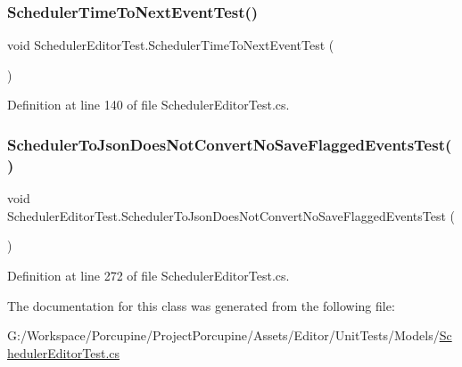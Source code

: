 \mbox{\label{class_scheduler_editor_test_ac42929cff725a4351a4dc54b6fcf05cb}} 
\subsubsection{\texorpdfstring{Scheduler\+Time\+To\+Next\+Event\+Test()}{SchedulerTimeToNextEventTest()}}
{\footnotesize\ttfamily void Scheduler\+Editor\+Test.\+Scheduler\+Time\+To\+Next\+Event\+Test (\begin{DoxyParamCaption}{ }\end{DoxyParamCaption})}



Definition at line 140 of file Scheduler\+Editor\+Test.\+cs.

\mbox{\label{class_scheduler_editor_test_a9307ec4d249726c96f46cfdfaa19c2b7}} 
\subsubsection{\texorpdfstring{Scheduler\+To\+Json\+Does\+Not\+Convert\+No\+Save\+Flagged\+Events\+Test()}{SchedulerToJsonDoesNotConvertNoSaveFlaggedEventsTest()}}
{\footnotesize\ttfamily void Scheduler\+Editor\+Test.\+Scheduler\+To\+Json\+Does\+Not\+Convert\+No\+Save\+Flagged\+Events\+Test (\begin{DoxyParamCaption}{ }\end{DoxyParamCaption})}



Definition at line 272 of file Scheduler\+Editor\+Test.\+cs.



The documentation for this class was generated from the following file\+:\begin{DoxyCompactItemize}
\item 
G\+:/\+Workspace/\+Porcupine/\+Project\+Porcupine/\+Assets/\+Editor/\+Unit\+Tests/\+Models/\hyperlink{_scheduler_editor_test_8cs}{Scheduler\+Editor\+Test.\+cs}\end{DoxyCompactItemize}
